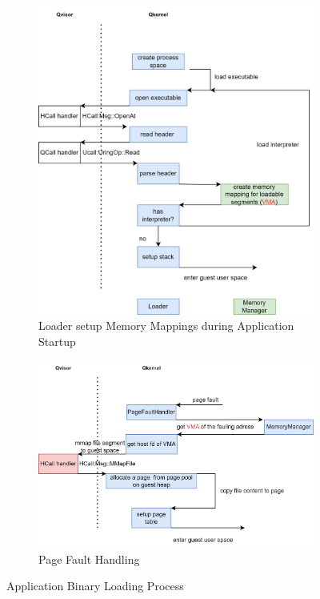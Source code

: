 \begin{figure}[ht] 
  \begin{subfigure}[b]{0.5\linewidth}
    \centering
    \includegraphics[width=0.9\linewidth]{images/loader_flow.png} 
    \caption{Loader setup Memory Mappings during Application Startup} 
    \label{fig2:a} 
    \vspace{4ex}
  \end{subfigure}%
  \begin{subfigure}[b]{0.5\linewidth}
    \centering
    \includegraphics[width=0.9\linewidth]{images/page_fault_handling.png} 
    \caption{Page Fault Handling} 
    \label{fig2:b} 
    \vspace{4ex}
  \end{subfigure} 
  \caption{Application Binary Loading Process}
  \label{fig2} 
\end{figure}

